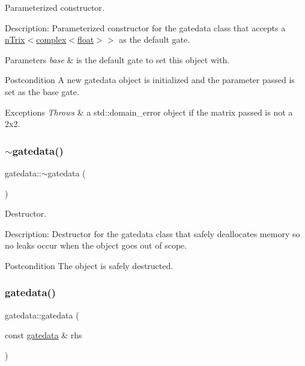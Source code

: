 Parameterized constructor. 

Description\+: Parameterized constructor for the gatedata class that accepts a \hyperlink{classnTrix}{n\+Trix}$<$\hyperlink{classcomplex}{complex$<$float$>$}$>$ as the default gate. 
\begin{DoxyParams}{Parameters}
{\em base} & is the default gate to set this object with. \\
\hline
\end{DoxyParams}
\begin{DoxyPostcond}{Postcondition}
A new gatedata object is initialized and the parameter passed is set as the base gate. 
\end{DoxyPostcond}

\begin{DoxyExceptions}{Exceptions}
{\em Throws} & a std\+::domain\+\_\+error object if the matrix passed is not a 2x2. \\
\hline
\end{DoxyExceptions}
\mbox{\label{classgatedata_a082f33e892b7fd081d0d1c209306f522}} 
\subsubsection{\texorpdfstring{$\sim$gatedata()}{~gatedata()}}
{\footnotesize\ttfamily gatedata\+::$\sim$gatedata (\begin{DoxyParamCaption}{ }\end{DoxyParamCaption})}



Destructor. 

Description\+: Destructor for the gatedata class that safely deallocates memory so no leaks occur when the object goes out of scope. \begin{DoxyPostcond}{Postcondition}
The object is safely destructed. 
\end{DoxyPostcond}
\mbox{\label{classgatedata_a71d1a00b05856567e2434e6e660c84ef}} 
\subsubsection{\texorpdfstring{gatedata()}{gatedata()}\hspace{0.1cm}{\footnotesize\ttfamily [3/3]}}
{\footnotesize\ttfamily gatedata\+::gatedata (\begin{DoxyParamCaption}\item[{const \hyperlink{classgatedata}{gatedata} \&}]{rhs }\end{DoxyParamCaption})}




